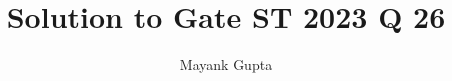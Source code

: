 \documentclass[journal,12pt,onecolumn]{IEEEtran}
\theoremstyle{remark}
\begin{document}
%




\vspace{3cm}

\title{
	Solution to Gate ST 2023 Q 26
}
\author{ Mayank Gupta %
}


%
%
%

% 
%



% 
\end{document}
